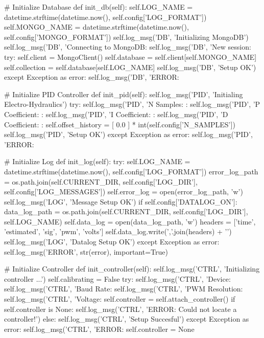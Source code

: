 \begin{python}
    # Initialize Database
    def init_db(self):
        self.LOG_NAME = datetime.strftime(datetime.now(), self.config['LOG_FORMAT'])
        self.MONGO_NAME = datetime.strftime(datetime.now(), self.config['MONGO_FORMAT'])
        self.log_msg('DB', 'Initializing MongoDB')
        self.log_msg('DB', 'Connecting to MongoDB: %
        self.log_msg('DB', 'New session: %
        try:
            self.client = MongoClient()
            self.database = self.client[self.MONGO_NAME]
            self.collection = self.database[self.LOG_NAME]
            self.log_msg('DB', 'Setup OK')
        except Exception as error:
            self.log_msg('DB', 'ERROR: %
    
    # Initialize PID Controller
    def init_pid(self):
        self.log_msg('PID', 'Initialing Electro-Hydraulics')
        try:
            self.log_msg('PID', 'N Samples: : %
            self.log_msg('PID', 'P Coefficient: : %
            self.log_msg('PID', 'I Coefficient: : %
            self.log_msg('PID', 'D Coefficient: : %
            self.offset_history = [ 0.0 ] * int(self.config['N_SAMPLES'])
            self.log_msg('PID', 'Setup OK')
        except Exception as error:
            self.log_msg('PID', 'ERROR: %
    
    # Initialize Log
    def init_log(self):
        try:
            self.LOG_NAME = datetime.strftime(datetime.now(), self.config['LOG_FORMAT'])
            error_log_path = os.path.join(self.CURRENT_DIR, self.config['LOG_DIR'], self.config['LOG_MESSAGES'])
            self.error_log = open(error_log_path, 'w')
            self.log_msg('LOG', 'Message Setup OK')
            if self.config['DATALOG_ON']:
                data_log_path = os.path.join(self.CURRENT_DIR, self.config['LOG_DIR'], self.LOG_NAME)
                self.data_log = open(data_log_path, 'w')
                headers = ['time', 'estimated', 'sig', 'pwm', 'volts']
                self.data_log.write(','.join(headers) + '\n')
            self.log_msg('LOG', 'Datalog Setup OK')
        except Exception as error:
            self.log_msg('ERROR', str(error), important=True)
            
    # Initialize Controller
    def init_controller(self):
        self.log_msg('CTRL', 'Initializing controller ...')
        self.calibrating = False
        try:
            self.log_msg('CTRL', 'Device: %
            self.log_msg('CTRL', 'Baud Rate: %
            self.log_msg('CTRL', 'PWM Resolution: %
            self.log_msg('CTRL', 'Voltage: %
            self.controller = self.attach_controller()
            if self.controller is None:
                self.log_msg('CTRL', 'ERROR: Could not locate a controller!')
            else:
                self.log_msg('CTRL', 'Setup Succesful')
        except Exception as error:
            self.log_msg('CTRL', 'ERROR: %
            self.controller = None
    

\end{python}
